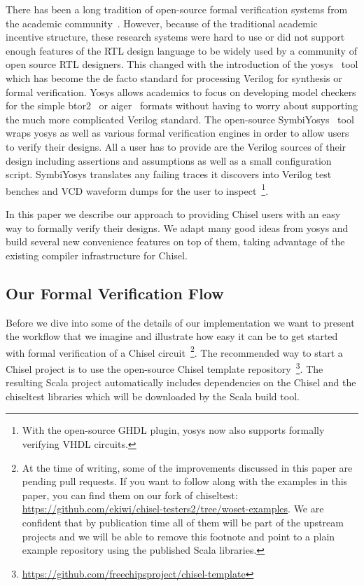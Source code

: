 \documentclass[conference]{IEEEtran}
\begin{document}
There has been a long tradition of open-source formal verification systems from the academic community~\cite{mcmillan1993smv, cimatti2000nusmv, mishchenko2007abc}.
However, because of the traditional academic incentive structure, these research systems were hard to use or did not support
enough features of the RTL design language to be widely used by a community of open source RTL designers.
This changed with the introduction of the yosys~\cite{yosys} tool which has become the de facto standard for processing
Verilog for synthesis or formal verification.
Yosys allows academics to focus on developing model checkers for the simple btor2~\cite{btor2} or aiger~\cite{aiger} formats
without having to worry about supporting the much more complicated Verilog standard.
The open-source SymbiYosys~\cite{symbiyosys} tool wraps yosys as well as various formal verification engines in order to allow users to
verify their designs. All a user has to provide are the Verilog sources of their design including assertions and assumptions
as well as a small configuration script. SymbiYosys translates any failing traces it discovers into Verilog test benches and VCD waveform dumps
for the user to inspect~\footnote{With the open-source GHDL plugin, yosys now also supports formally verifying VHDL circuits.}.


In this paper we describe our approach to providing Chisel users with an easy way to formally verify their designs.
We adapt many good ideas from yosys and build several new convenience features on top of them, taking advantage
of the existing compiler infrastructure for Chisel.

\subsection{Our Formal Verification Flow}\label{sec:flow}


Before we dive into some of the details of our implementation we want to present
the workflow that we imagine and illustrate how easy it can be to get started
with formal verification of a Chisel circuit~\footnote{
At the time of writing, some of the improvements discussed in this paper are pending pull requests.
If you want to follow along with the examples in this paper, you can find them on our fork of chiseltest: \url{https://github.com/ekiwi/chisel-testers2/tree/woset-examples}.
We are confident that by publication time all of them will be part of the upstream projects and we will be able to remove this footnote
and point to a plain example repository using the published Scala libraries.}.
The recommended way to start a Chisel project is to use the open-source Chisel template 
repository~\footnote{\url{https://github.com/freechipsproject/chisel-template}}.
The resulting Scala project automatically includes dependencies on the Chisel and the chiseltest
libraries which will be downloaded by the Scala build tool.
\end{document}
